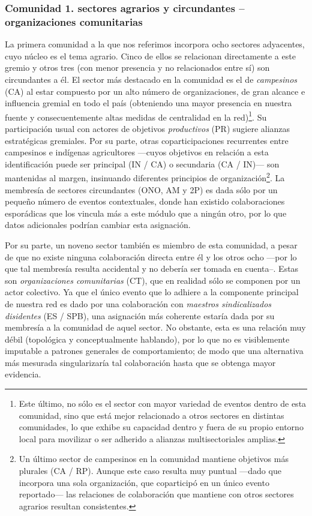\documentclass[letterpaper, 11pt]{book}
\theoremstyle{definition}
\theoremstyle{remark}
\begin{document}
\subsubsection{Comunidad 1. sectores agrarios y circundantes -- organizaciones comunitarias}
\label{subsubsec:comunidad1}


La primera comunidad a la que nos referimos incorpora ocho sectores adyacentes, cuyo núcleo es el tema agrario. 
Cinco de ellos se relacionan directamente a este gremio y otros tres (con menor presencia y no relacionados entre sí) son circundantes a él. 
El sector más destacado en la comunidad es el de \emph{campesinos} (CA) al estar compuesto por un alto número de organizaciones, de gran alcance e influencia gremial en todo el país (obteniendo una mayor presencia en nuestra fuente y consecuentemente altas medidas de centralidad en la red)\footnote{
    Este último, no sólo es el sector con mayor variedad de eventos dentro de esta comunidad, sino que está mejor relacionado a otros sectores en distintas comunidades, lo que exhibe su capacidad dentro y fuera de su propio entorno local para movilizar o ser adherido a alianzas multisectoriales amplias. 
}. 
Su participación usual con actores de objetivos \emph{productivos} (PR) sugiere alianzas estratégicas gremiales. 
Por su parte, otras coparticipaciones recurrentes entre campesinos e indígenas agricultores ---cuyos objetivos en relación a esta identificación puede ser principal (IN / CA) o secundaria (CA / IN)--- son mantenidas al margen, insinuando diferentes principios de organización\footnote{
    Un último sector de campesinos en la comunidad mantiene objetivos más plurales (CA / RP). 
    Aunque este caso resulta muy puntual ---dado que incorpora una sola organización, que coparticipó en un único evento reportado--- las relaciones de colaboración que mantiene con otros sectores agrarios resultan consistentes.
}. 
La membresía de sectores circundantes (ONO, AM y 2P) es dada sólo por un pequeño número de eventos contextuales, donde han existido colaboraciones esporádicas que los vincula más a este módulo que a ningún otro, por lo que datos adicionales podrían cambiar esta asignación. 





Por su parte, un noveno sector también es miembro de esta comunidad, a pesar de que no existe ninguna colaboración directa entre él y los otros ocho ---por lo que tal membresía resulta accidental y no debería ser tomada en cuenta--. 
Estas son \emph{organizaciones comunitarias} (CT), que en realidad sólo se componen por un actor colectivo. 
Ya que el único evento que lo adhiere a la componente principal de nuestra red es dado por una colaboración con \emph{maestros sindicalizados disidentes} (ES / SPB), una asignación más coherente estaría dada por su membresía a la comunidad de aquel sector. 
No obstante, esta es una relación muy débil (topológica y conceptualmente hablando), por lo que no es visiblemente imputable a patrones generales de comportamiento; de modo que una alternativa más mesurada singularizaría tal colaboración hasta que se obtenga mayor evidencia.
\end{document}
